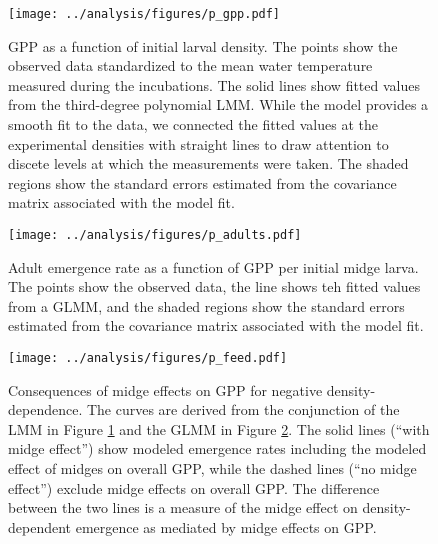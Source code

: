 \documentclass[12pt]{article}
\begin{document}
\begin{figure}
\centering
\texttt{[image: ../analysis/figures/p\_gpp.pdf]}
\caption{\label{fig:gpp}
GPP as a function of initial larval density.
The points show the observed data standardized to the mean water temperature
measured during the incubations.
The solid lines show fitted values from the third-degree polynomial LMM.
While the model provides a smooth fit to the data,
we connected the fitted values at the experimental densities with
straight lines to draw attention to discete levels at which the measurements were taken. 
The shaded regions show the standard errors estimated from the 
covariance matrix associated with the model fit.
}
\end{figure}

\clearpage




\begin{figure}
\centering
\texttt{[image: ../analysis/figures/p\_adults.pdf]}
\caption{\label{fig:adults}
Adult emergence rate as a function of GPP per initial midge larva.
The points show the observed data, 
the line shows teh fitted values from a GLMM,
and the shaded regions show the standard errors estimated from the 
covariance matrix associated with the model fit.
}
\end{figure}

\clearpage


\begin{figure}
\centering
\texttt{[image: ../analysis/figures/p\_feed.pdf]}
\caption{\label{fig:feed}
Consequences of midge effects on GPP for negative density-dependence.
The curves are derived from the conjunction of the LMM in Figure \ref{fig:gpp}
and the GLMM in Figure \ref{fig:adults}. 
The solid lines (``with midge effect'') show modeled emergence rates including the modeled
effect of midges on overall GPP,
while the dashed lines (``no midge effect'') exclude midge effects on overall GPP.
The difference between the two lines is a measure of the midge effect on density-dependent
emergence as mediated by midge effects on GPP. 
}
\end{figure}

\clearpage





\end{document}

